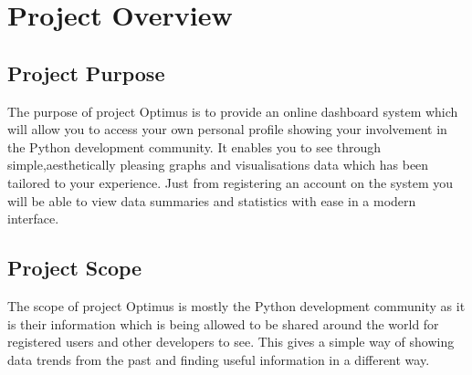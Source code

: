 
\chapter{Project Overview} %

\label{Part6Chapter2} %



\section{Project Purpose}

The purpose of project Optimus is to provide an online dashboard system which will allow you to access your own personal profile showing your involvement in the Python development community. It enables you to see through simple,aesthetically pleasing graphs and visualisations data which has been tailored to your experience. Just from registering an account on the system you will be able to view data summaries and statistics with ease in a modern interface.


\section{Project Scope}

The scope of project Optimus is mostly the Python development community as it is their information which is being allowed to be shared around the world for registered users and other developers to see. This gives a simple way of showing data trends from the past and finding useful information in a different way.


